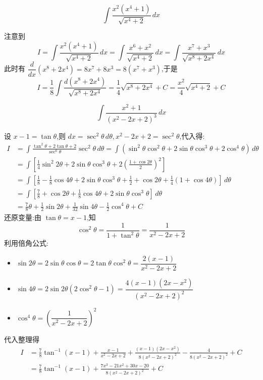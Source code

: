 \begin{questions}
    \question
    \[
    \int \frac{x^2(x^4+1)}{\sqrt{x^4+2}} \, dx
    \]
    \begin{solution}
        注意到
        \[
        I =\int \frac{x^2(x^4+1)}{\sqrt{x^4+2}} \, dx = \int \frac{x^6+x^2}{\sqrt{x^4+2}} \, dx = \int \frac{x^7+x^3}{\sqrt{x^8+2x^4}} \, dx
        \]
        此时有 $\dfrac{d}{dx}(x^8+2x^4) = 8x^7+8x^3 = 8(x^7+x^3)$,于是
        \[
        I = \frac{1}{8} \int \frac{d(x^8+2x^4)}{\sqrt{x^8+2x^4}} = \frac{1}{4}\sqrt{x^8+2x^4} + C = \frac{x^2}{4}\sqrt{x^4+2} + C
        \]
    \end{solution}

    \question
    \[
    \int \frac{x^2+1}{(x^2-2x+2)^3} \, dx
    \]
    \begin{solution}
        设 $x-1 = \tan \theta$,则 $dx = \sec^2 \theta \, d\theta,x^2-2x+2 = \sec^2 \theta$,代入得:
        \begin{align*}
        I &= \int \frac{\tan^2\theta + 2\tan\theta + 2}{\sec^6\theta} \sec^2\theta \, d\theta = \int (\sin^2\theta\cos^2\theta + 2\sin\theta\cos^3\theta + 2\cos^4\theta) \, d\theta \\
        &= \int \left[ \frac{1}{4}\sin^2 2\theta + 2\sin\theta\cos^3\theta + 2\left(\frac{1+\cos 2\theta}{2}\right)^2 \right] \, \\
        &= \int \left[ \frac{1}{8} - \frac{1}{8}\cos 4\theta + 2\sin\theta\cos^3\theta + \frac{1}{2} + \cos 2\theta + \frac{1}{4}(1+\cos 4\theta) \right] \, d\theta \\
        &= \int \left[ \frac{7}{8} + \cos 2\theta + \frac{1}{8}\cos 4\theta + 2\sin\theta\cos^3\theta \right] \, d\theta \\
        &= \frac{7}{8}\theta + \frac{1}{2}\sin 2\theta + \frac{1}{32}\sin 4\theta - \frac{1}{2}\cos^4\theta + C
        \end{align*}
        还原变量:由 $\tan \theta = x-1$,知 
        \[
        \cos^2 \theta = \frac{1}{1+\tan^2 \theta} = \frac{1}{x^2-2x+2}
        \]
        利用倍角公式:
        \begin{itemize}
        \item $\sin 2\theta = 2\sin\theta\cos\theta = 2\tan\theta\cos^2\theta = \dfrac{2(x-1)}{x^2-2x+2}$
        \item $\sin 4\theta = 2\sin 2\theta(2\cos^2\theta-1) = \dfrac{4(x-1)(2x-x^2)}{(x^2-2x+2)^2}$
        \item $\cos^4 \theta = \left(\dfrac{1}{x^2-2x+2}\right)^2$
        \end{itemize}
        代入整理得
        \begin{align*}
        I &= \frac{7}{8} \tan^{-1}(x-1) + \frac{x-1}{x^2-2x+2} + \frac{(x-1)(2x-x^2)}{8(x^2-2x+2)^2} - \frac{4}{8(x^2-2x+2)^2} + C \\
        &= \frac{7}{8} \tan^{-1}(x-1) + \frac{7x^3-21x^2+30x-20}{8(x^2-2x+2)^2} + C
        \end{align*}
    \end{solution}


\end{questions}
